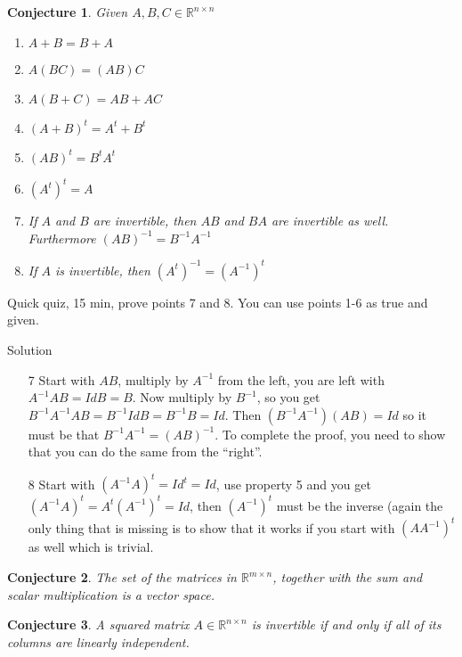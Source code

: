 \documentclass[aspectratio=169]{beamer}
\newtheorem{proposition}{Conjecture}[section]
\begin{document}
\begin{frame}
    \begin{proposition}
        Given $A,B,C\in\mathds{R}^{n\times n}$
        
        \begin{enumerate}
            \item $A+B=B+A$
            \item $A(BC)=(AB)C$
            \item $A(B+C)=AB+AC$
            \item $(A+B)^t = A^t+B^t$
            \item $(AB)^t=B^tA^t$
            \item $(A^t)^t=A$
            \item If $A$ and $B$ are invertible, then $AB$ and $BA$ are invertible as well. Furthermore $(AB)^{-1}=B^{-1}A^{-1}$
            \item If $A$ is invertible, then $(A^t)^{-1}=(A^{-1})^t$
        \end{enumerate}
    \end{proposition}
\end{frame}

\begin{frame}
    Quick quiz, 15 min, prove points 7 and 8. You can use points 1-6 as true and given.
\end{frame}

\begin{frame}{Solution}
    \begin{enumerate}
    
    \item[7] Start with $AB$, multiply by $A^{-1}$ from the left, you are left with $A^{-1}AB = Id B = B$. Now multiply by $B^{-1}$, so you get $B^{-1}A^{-1}AB = B^{-1}IdB=B^{-1}B=Id$. Then $(B^{-1}A^{-1})(AB) = Id$ so it must be that $B^{-1}A^{-1}=(AB)^{-1}$. To complete the proof, you need to show that you can do the same from the ``right''.
    
    \item[8] Start with $(A^{-1}A)^t = Id ^t = Id$, use property 5 and you get $(A^{-1}A)^t = A^t (A^{-1})^t = Id$, then $(A^{-1})^t$ must be the inverse (again the only thing that is missing is to show that it works if you start with $(A A^{-1})^t$ as well which is trivial.
    
    \end{enumerate}
\end{frame}

\begin{frame}
\begin{proposition}
    The set of the matrices in $\mathds{R}^{m\times n}$, together with the sum and scalar multiplication is a vector space.    
\end{proposition}

\begin{proposition}
A squared matrix $A\in\mathds{R}^{n\times n}$ is invertible if and only if all of its columns are linearly independent.
\end{proposition}
\end{frame}
\end{document}
